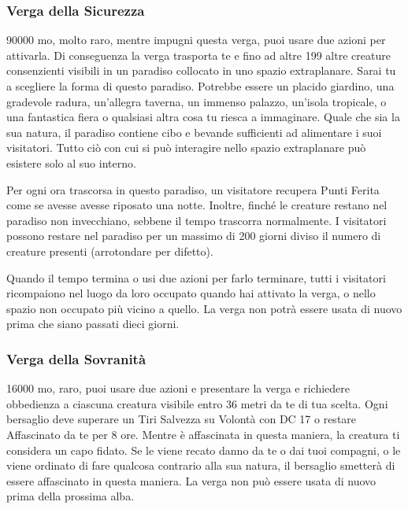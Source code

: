 \begin{multicols}{2}
\subsubsection*{Verga della Sicurezza}
90000 mo, molto raro, mentre impugni questa verga, puoi usare due azioni per attivarla. Di conseguenza la verga trasporta te e fino ad altre 199 altre creature consenzienti visibili in un paradiso collocato in uno spazio extraplanare. Sarai tu a scegliere la forma di questo paradiso. Potrebbe essere un placido giardino, una gradevole radura, un'allegra taverna, un immenso palazzo, un'isola tropicale, o una fantastica fiera o qualsiasi altra cosa tu riesca a immaginare. Quale che sia la sua natura, il paradiso contiene cibo e bevande sufficienti ad alimentare i suoi visitatori. Tutto ciò con cui si può interagire nello spazio extraplanare può esistere solo al suo interno.

Per ogni ora trascorsa in questo paradiso, un visitatore recupera Punti Ferita come se avesse avesse riposato una notte. Inoltre, finché le creature restano nel paradiso non invecchiano, sebbene il tempo trascorra normalmente. I visitatori possono restare nel paradiso per un massimo di 200 giorni diviso il numero di creature presenti (arrotondare per difetto).

Quando il tempo termina o usi due azioni per farlo terminare, tutti i visitatori ricompaiono nel luogo da loro occupato quando hai attivato la verga, o nello spazio non occupato più vicino a quello. La verga non potrà essere usata di nuovo prima che siano passati dieci giorni.

\subsubsection*{Verga della Sovranità}
16000 mo, raro, puoi usare due azioni e presentare la verga e richiedere obbedienza a ciascuna creatura visibile entro 36 metri da te di tua scelta. Ogni bersaglio deve superare un Tiri Salvezza su Volontà con DC 17 o restare Affascinato da te per 8 ore. Mentre è affascinata in questa maniera, la creatura ti considera un capo fidato. Se le viene recato danno da te o dai tuoi compagni, o le viene ordinato di fare qualcosa contrario alla sua natura, il bersaglio smetterà di essere affascinato in questa maniera. La verga non può essere usata di nuovo prima della prossima alba.


\end{multicols}
